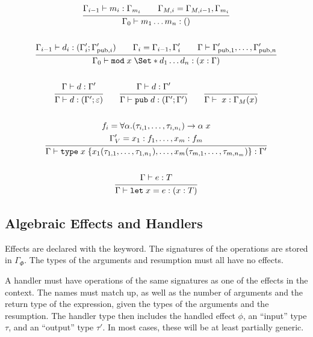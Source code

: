 \begin{gather*}
    \infer{
        \Gamma_0 \vdash m_1\dots m_n: ()
    }{
        \Gamma_{i-1} \vdash m_i: \Gamma_{m_i}
        \qquad
        \Gamma_{M,i} = \Gamma_{M,i-1}, \Gamma_{m_i}
    }
    \\\\
    \infer{
        \Gamma_0 \vdash \kw{mod}\;x\;\S{ d_1 \dots d_n }: (x: \Gamma)
    }{
        \Gamma_{i-1} \vdash d_i : (\Gamma'_i; \Gamma'_{\text{pub}, i})
        \qquad
        \Gamma_i = \Gamma_{i-1}, \Gamma'_i
        \qquad
        \Gamma \vdash \Gamma'_{\text{pub},1}, \dots, \Gamma'_{\text{pub},n}
    }
    \\\\
    \infer{
        \Gamma \vdash d : (\Gamma'; \varepsilon)
    }{
        \Gamma \vdash d : \Gamma'
    }
    \qquad
    \infer{
        \Gamma \vdash \kw{pub}\;d : (\Gamma'; \Gamma')
    }{
        \Gamma \vdash d : \Gamma'
    }
    \qquad
    \infer{
        \Gamma \vdash \;x : \Gamma_M(x)
    }{}
    \\\\
    \infer{
        \Gamma \vdash \type\;x \;
        \{ x_1(\tau_{1,1}, \dots, \tau_{1,n_1}), \dots, x_m(\tau_{m,1}, \dots, \tau_{m,n_m}) \} : \Gamma'
    }{
        f_i = \forall \alpha. (\tau_{i,1}, \dots, \tau_{i,n_i}) \to \alpha\;x
        \\
        \Gamma'_V = x_1: f_1,\dots,x_m: f_m
    }
    \\\\
    \infer{
        \Gamma \vdash \kw{let}\;x = e : (x: T)
    }{
        \Gamma \vdash e : T
    }
\end{gather*}

\subsection{Algebraic Effects and Handlers}
Effects are declared with the  keyword. The signatures of the operations are stored in $\Gamma_\Phi$. The types of the arguments and resumption must all have no effects.

A handler must have operations of the same signatures as one of the effects in the context. The names must match up, as well as the number of arguments and the return type of the expression, given the types of the arguments and the resumption. The handler type then includes the handled effect $\phi$, an ``input'' type $\tau$, and an ``output'' type $\tau'$. In most cases, these will be at least partially generic.

